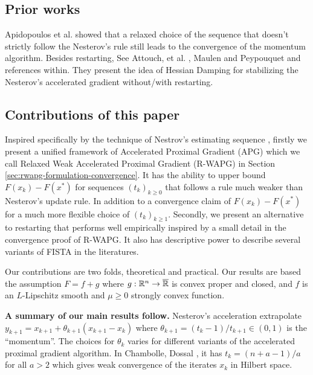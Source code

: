 \documentclass[12pt]{article}
\begin{document}
        \subsection{Prior works}
            Apidopoulos et al. \cite{apidopoulos_convergence_2018} showed that a relaxed choice of the sequence that doesn't strictly follow the Nesterov's rule still leads to the convergence of the momentum algorithm. 
            Besides restarting, See Attouch, et al. \cite{attouch_first-order_2022}, Maulen and Peypouquet \cite{maulen_speed_2023} and references within.
            They present the idea of Hessian Damping for stabilizing the Nesterov's accelerated gradient without/with restarting. 

    \subsection{Contributions of this paper}
        Inspired specifically by the technique of Nestrov's estimating sequence \cite{nesterov_lectures_2018}, firstly we present a unified framework of Accelerated Proximal Gradient (APG) which we call Relaxed Weak Accelerated Proximal Gradient (R-WAPG) in Section \ref{sec:rwapg-formulation-convergence}.
        It has the ability to upper bound $F(x_k) - F(x^*)$ for sequences $(t_k)_{k \ge 0}$ that follows a rule much weaker than Nesterov's update rule. 
        In addition to a convergence claim of $F(x_k)- F(x^*)$ for a much more flexible choice of $(t_k)_{k \ge 1}$. 
        Secondly, we present an alternative to restarting that performs well empirically inspired by a small detail in the convergence proof of R-WAPG. 
        It also has descriptive power to describe several variants of FISTA in the literatures.  
        \par
        Our contributions are two folds, theoretical and practical. 
        Our results are based the assumption $F = f + g$ where $g:\mathbb R^n \rightarrow \overline{\mathbb R}$ is convex proper and closed, and $f$ is an $L$-Lipschitz smooth and $\mu \ge 0$ strongly convex function. 
        \par
        \textbf{A summary of our main results follow. } 
        Nesterov's acceleration extrapolate $y_{k + 1} = x_{k + 1} + \theta_{k + 1}(x_{k + 1} - x_k)$ where $\theta_{k + 1} = (t_{k} - 1)/t_{k + 1} \in (0, 1)$ is the ``momentum''. 
        The choices for $\theta_k$ varies for different variants of the accelerated proximal gradient algorithm. 
        In Chambolle, Dossal \cite{chambolle_convergence_2015}, it has $t_k = (n + a - 1)/a$ for all $a > 2$ which gives weak convergence of the iterates $x_k$ in Hilbert space. 
\end{document}
